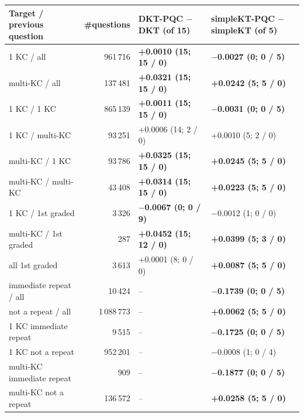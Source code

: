 \begin{tabular}{@{}l r l l@{}}
\toprule
Target / previous question & \#questions
  & \makecell[l]{DKT-PQC $-$ DKT\\(of 15)}
  & \makecell[l]{simpleKT-PQC\\$-$ simpleKT (of 5)} \\
\midrule
1 KC / all & 961\,716 & \textbf{+0.0010 (15; 15 / 0)} & \textbf{$-$0.0027 (0; 0 / 5)} \\
multi-KC / all & 137\,481 & \textbf{+0.0321 (15; 15 / 0)} & \textbf{+0.0242 (5; 5 / 0)} \\
\midrule
1 KC / 1 KC & 865\,139 & \textbf{+0.0011 (15; 15 / 0)} & \textbf{$-$0.0031 (0; 0 / 5)} \\
1 KC / multi-KC & 93\,251 & +0.0006 (14; 2 / 0) & +0.0010 (5; 2 / 0) \\
multi-KC / 1 KC & 93\,786 & \textbf{+0.0325 (15; 15 / 0)} & \textbf{+0.0245 (5; 5 / 0)} \\
multi-KC / multi-KC & 43\,408 & \textbf{+0.0314 (15; 15 / 0)} & \textbf{+0.0223 (5; 5 / 0)} \\
\midrule
1 KC / 1st graded & 3\,326 & \textbf{$-$0.0067 (0; 0 / 9)} & $-$0.0012 (1; 0 / 0) \\
multi-KC / 1st graded & 287 & \textbf{+0.0452 (15; 12 / 0)} & \textbf{+0.0399 (5; 3 / 0)} \\
all 1st graded & 3\,613 & +0.0001 (8; 0 / 0) & \textbf{+0.0087 (5; 5 / 0)} \\
\midrule
immediate repeat / all & 10\,424 & -- & \textbf{$-$0.1739 (0; 0 / 5)} \\
not a repeat / all & 1\,088\,773 & -- & \textbf{+0.0062 (5; 5 / 0)} \\
1 KC immediate repeat & 9\,515 & -- & \textbf{$-$0.1725 (0; 0 / 5)} \\
1 KC not a repeat & 952\,201 & -- & $-$0.0008 (1; 0 / 4) \\
multi-KC immediate repeat & 909 & -- & \textbf{$-$0.1877 (0; 0 / 5)} \\
multi-KC not a repeat & 136\,572 & -- & \textbf{+0.0258 (5; 5 / 0)} \\
\bottomrule
\end{tabular}
